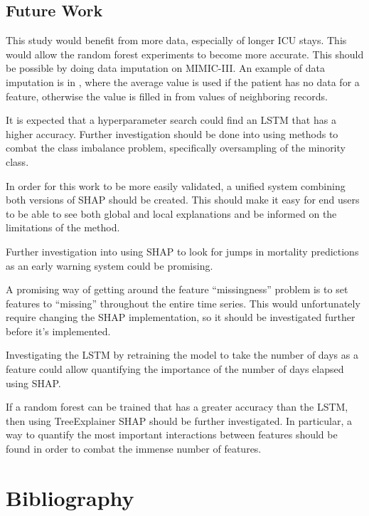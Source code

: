 \documentclass[12pt]{article}
\begin{document}
\subsection{Future Work}

This study would benefit from more data, especially of longer ICU stays. This would allow the random forest experiments to become more accurate. This should be possible by doing data imputation on MIMIC-III. An example of data imputation is in \cite{ICUBidirectionalLSTM}, where the average value is used if the patient has no data for a feature, otherwise the value is filled in from values of neighboring records.

It is expected that a hyperparameter search could find an LSTM that has a higher accuracy. Further investigation should be done into using methods to combat the class imbalance problem, specifically oversampling of the minority class.

In order for this work to be more easily validated, a unified system combining both versions of SHAP should be created. This should make it easy for end users to be able to see both global and local explanations and be informed on the limitations of the method.

Further investigation into using SHAP to look for jumps in mortality predictions as an early warning system could be promising. 

A promising way of getting around the feature ``missingness'' problem is to set features to ``missing'' throughout the entire time series. This would unfortunately require changing the SHAP implementation, so it should be investigated further before it's implemented.

Investigating the LSTM by retraining the model to take the number of days as a feature could allow quantifying the importance of the number of days elapsed using SHAP. 

If a random forest can be trained that has a greater accuracy than the LSTM, then using TreeExplainer SHAP should be further investigated. In particular, a way to quantify the most important interactions between features should be found in order to combat the immense number of features.

\section{Bibliography}
\end{document}
